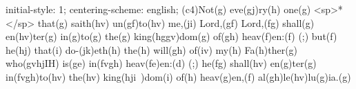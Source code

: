 initial-style: 1;
centering-scheme: english;
(c4)Not(g) eve(gj)ry(h) one(g) <sp>*</sp> that(g) saith(hv) un(gf)to(hv) me,(ji) Lord,(gf) Lord,(fg) shall(g) en(hv)ter(g) in(g)to(g) the(g) king(hggv)dom(g) of(gh) heav(f)en:(f) (;) but(f) he(hj) that(i) do-(jk)eth(h) the(h) will(gh) of(iv) my(h) Fa(h)ther(g) who(gvhjIH) is(ge) in(fvgh) heav(fe)en:(d) (;) he(fg) shall(hv) en(g)ter(g) in(fvgh)to(hv) the(hv) king(hji~)dom(i) of(h) heav(g)en,(f) al(gh)le(hv)lu(g)ia.(g)

